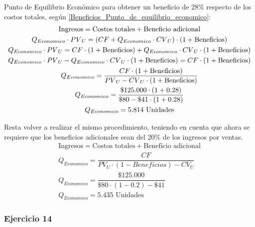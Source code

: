 \documentclass[12pt,a4paper]{article}
\begin{document}
        Punto de Equilibrio Económico para obtener un beneficio de 28\% respecto de los costos totales, según \ref{Beneficios_Punto_de_equilibrio_economico}:
            \begin{gather}
            	\text{Ingresos} = \text{Costos totales} + \text{Beneficio adicional} \notag \\
                Q_{Economico} \cdot {PV}_{U} = ( CF + Q_{Economico} \cdot {CV}_{U} ) \cdot ( 1 + \text{Beneficios} ) \notag \\
                Q_{Economico} \cdot {PV}_{U} = CF \cdot ( 1 + \text{Beneficios} ) + Q_{Economico} \cdot {CV}_{U} \cdot ( 1 + \text{Beneficios} ) \notag \\
                Q_{Economico} \cdot {PV}_{U} - Q_{Economico} \cdot {CV}_{U} \cdot ( 1 + \text{Beneficios} ) = CF \cdot ( 1 + \text{Beneficios} ) \notag \\
                Q_{Economico} = \dfrac{CF \cdot ( 1 + \text{Beneficios} )}{ {PV}_{U} - {CV}_{U} \cdot ( 1 + \text{Beneficios} ) } \\
                Q_{Economico} = \dfrac{ \$125{.}000 \cdot (1+0.28)}{ \$80 - \$41 \cdot ( 1 + 0.28 ) } \notag \\
                Q_{Economico} = 5{.}814\text{ Unidades} \notag
            \end{gather}
		
        Resta volver a realizar el mismo procedimiento, teniendo en cuenta que ahora se requiere que los beneficios adicionales sean del 20\% de los ingresos por ventas.
            \begin{gather*}
            	\text{Ingresos} = \text{Costos totales} + \text{Beneficio adicional} \\
                Q_{Economico} = \dfrac{CF}{ {PV}_{U} \cdot ( 1 - Beneficios ) - {CV}_{U} } \\
                Q_{Economico} = \dfrac{\$125{.}000}{ \$80 \cdot ( 1 - 0.2 ) - \$41 } \\
                Q_{Economico} = 5{.}435 \text{ Unidades}
            \end{gather*}
        
    
    	\newpage
        
    	\subsubsection{Ejercicio 14}
        
\end{document}
